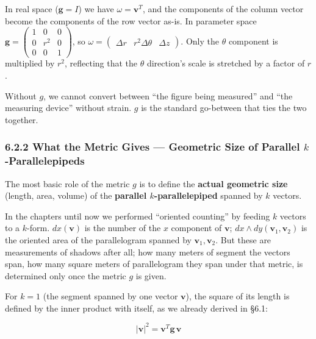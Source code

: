 \documentclass[a4paper,12pt,openany]{book}
\begin{document}
In real space (\(\mathbf{g}=I\)) we have \(\omega = \mathbf{v}^T\), and
the components of the column vector become the components of the row
vector as-is. In parameter space
\(\mathbf{g} = \begin{pmatrix} 1 & 0 & 0 \\ 0 & r^2 & 0 \\ 0 & 0 & 1 \end{pmatrix}\),
so
\(\omega = \begin{pmatrix} \Delta r & r^2\Delta\theta & \Delta z \end{pmatrix}\).
Only the \(\theta\) component is multiplied by \(r^2\), reflecting that
the \(\theta\) direction's scale is stretched by a factor of \(r\).

Without \(g\), we cannot convert between ``the figure being measured''
and ``the measuring device'' without strain. \(g\) is the standard
go-between that ties the two together.

\hypertarget{what-the-metric-gives-geometric-size-of-parallel-k-parallelepipeds}{%
\subsubsection{\texorpdfstring{6.2.2 What the Metric Gives — Geometric
Size of Parallel
\(k\)-Parallelepipeds}{6.2.2 What the Metric Gives — Geometric Size of Parallel k-Parallelepipeds}}\label{what-the-metric-gives-geometric-size-of-parallel-k-parallelepipeds}}

The most basic role of the metric \(g\) is to define the
\textbf{actual geometric size} (length, area, volume) of the
\textbf{parallel $k$-parallelepiped} spanned by \(k\) vectors.

In the chapters until now we performed ``oriented counting'' by feeding
\(k\) vectors to a \(k\)-form. \(dx(\mathbf{v})\) is the number of the
\(x\) component of \(\mathbf{v}\);
\(dx \wedge dy(\mathbf{v}_1, \mathbf{v}_2)\) is the oriented area of the
parallelogram spanned by \(\mathbf{v}_1, \mathbf{v}_2\). But these are
measurements of shadows after all; how many meters of segment the
vectors span, how many square meters of parallelogram they span under
that metric, is determined only once the metric \(g\) is given.

For \(k=1\) (the segment spanned by one vector \(\mathbf{v}\)), the
square of its length is defined by the inner product with itself, as we
already derived in §6.1:

\[|\mathbf{v}|^2 = \mathbf{v}^T \mathbf{g} \,\mathbf{v}\]
\end{document}
